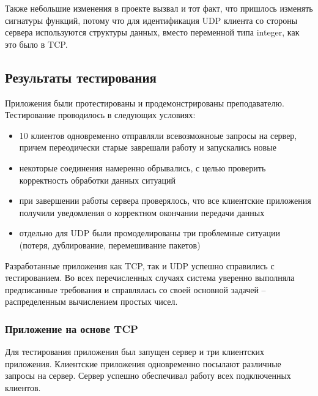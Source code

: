 \documentclass[a4paper,14pt]{extarticle}
\begin{document}
Также небольшие изменения в проекте вызвал и тот факт, что пришлось изменять сигнатуры функций, потому что для идентификация UDP клиента со стороны сервера используются структуры данных, вместо переменной типа integer, как это было в TCP.

\subsection{Результаты тестирования}

Приложения были протестированы и продемонстрированы преподавателю. Тестирование проводилось в следующих условиях:
\begin{itemize}
\item 10 клиентов одновременно отправляли всевозможноые запросы на сервер, причем переодически старые заврешали работу и запускались новые
\item некоторые соединения намеренно обрывались, с целью проверить корректность обработки данных ситуаций
\item при завершении работы сервера проверялось, что все клиентские приложения получили уведомления о корректном окончании передачи данных
\item отдельно для UDP были промоделированы три проблемные ситуации (потеря, дублирование, перемешивание пакетов)
\end{itemize}
Разработанные приложения как TCP, так и UDP успешно справились с тестированием. Во всех перечисленных случаях система уверенно выполняла предписанные требования и справлялась со своей основной задачей -- распределенным вычислением простых чисел.

\subsubsection{Приложение на основе TCP}
Для тестирования приложения был запущен сервер и три клиентских приложения. Клиентские приложения одновременно посылают различные запросы на сервер. Сервер успешно обеспечивал работу всех подключенных клиентов.
\end{document}
